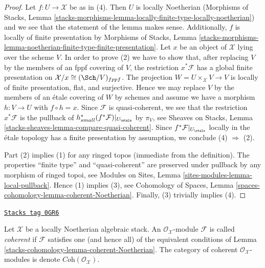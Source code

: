 \begin{proof}
Let $f : U \to \mathcal{X}$ be as in (4).
Then $U$ is locally Noetherian (Morphisms of Stacks, Lemma
\ref{stacks-morphisms-lemma-locally-finite-type-locally-noetherian})
and we see that the statement of the lemma makes sense. Additionally,
$f$ is locally of finite presentation by Morphisms of Stacks, Lemma
\ref{stacks-morphisms-lemma-noetherian-finite-type-finite-presentation}.
Let $x$ be an object of $\mathcal{X}$ lying over the scheme $V$.
In order to prove (2) we have to show that, after replacing $V$
by the members of an fppf covering of $V$, the restriction $x^*\mathcal{F}$
has a global finite presentation on $\mathcal{X}/x \cong (\Sch/V)_{fppf}$.
The projection $W = U \times_\mathcal{X} V \to V$ is
locally of finite presentation, flat, and surjective.
Hence we may replace $V$ by the members of an \'etale covering of $W$
by schemes and assume we have a morphism $h : V \to U$ with $f \circ h = x$.
Since $\mathcal{F}$ is quasi-coherent, we see that
the restriction $x^*\mathcal{F}$
is the pullback of $h_{small}^*(f^*\mathcal{F})|_{U_\etale}$
by $\pi_V$, see Sheaves on Stacks, Lemma
\ref{stacks-sheaves-lemma-compare-quasi-coherent}.
Since $f^*\mathcal{F}|_{U_\etale}$ locally in the
\'etale topology has a finite presentation by assumption, we conclude
(4) $\Rightarrow$ (2).

\medskip\noindent
Part (2) implies (1) for any ringed topos (immediate from the definition).
The properties ``finite type'' and ``quasi-coherent''
are preserved under pullback by any morphism of ringed topoi, see
Modules on Sites, Lemma \ref{sites-modules-lemma-local-pullback}.
Hence (1) implies (3), see Cohomology of Spaces, Lemma
\ref{spaces-cohomology-lemma-coherent-Noetherian}.
Finally, (3) trivially implies (4).
\end{proof}

\begin{definition}[Coherent]
\label{stacks-cohomology-definition-coherent}
\href{https://stacks.math.columbia.edu/tag/0GR6}{\texttt{Stacks tag 0GR6}}

Let $\mathcal{X}$ be a locally Noetherian algebraic stack.
An $\mathcal{O}_\mathcal{X}$-module $\mathcal{F}$ is called {\it coherent}
if $\mathcal{F}$ satisfies one (and hence all) of the equivalent
conditions of Lemma \ref{stacks-cohomology-lemma-coherent-Noetherian}.
The category of coherent $\mathcal{O}_\mathcal{X}$-modules is
denote $\textit{Coh}(\mathcal{O}_\mathcal{X})$.
\end{definition}

